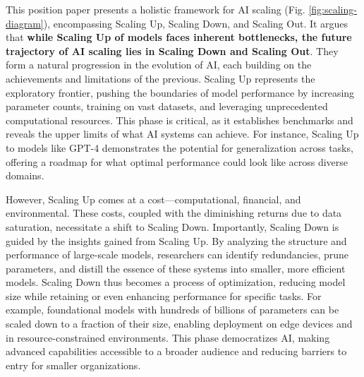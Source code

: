This position paper presents a holistic framework for AI scaling (Fig. \ref{fig:scaling-diagram}), encompassing Scaling Up, Scaling Down, and Scaling Out. It argues that \textbf{while Scaling Up of models faces inherent bottlenecks, the future trajectory of AI scaling lies in Scaling Down and Scaling Out}.
They form a natural progression in the evolution of AI, each building on the achievements and limitations of the previous. Scaling Up represents the exploratory frontier, pushing the boundaries of model performance by increasing parameter counts, training on vast datasets, and leveraging unprecedented computational resources. This phase is critical, as it establishes benchmarks and reveals the upper limits of what AI systems can achieve. For instance, Scaling Up to models like GPT-4 demonstrates the potential for generalization across tasks, offering a roadmap for what optimal performance could look like across diverse domains.

However, Scaling Up comes at a cost—computational, financial, and environmental. These costs, coupled with the diminishing returns due to data saturation, necessitate a shift to Scaling Down. Importantly, Scaling Down is guided by the insights gained from Scaling Up. By analyzing the structure and performance of large-scale models, researchers can identify redundancies, prune parameters, and distill the essence of these systems into smaller, more efficient models. Scaling Down thus becomes a process of optimization, reducing model size while retaining or even enhancing performance for specific tasks. For example, foundational models with hundreds of billions of parameters can be scaled down to a fraction of their size, enabling deployment on edge devices and in resource-constrained environments. This phase democratizes AI, making advanced capabilities accessible to a broader audience and reducing barriers to entry for smaller organizations.

